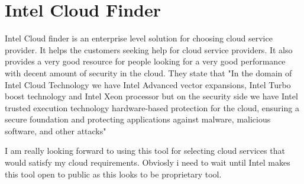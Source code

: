 \section{Intel Cloud Finder}

Intel Cloud finder is an enterprise level solution for choosing cloud service 
provider. It helps the customers seeking help for cloud service providers. It 
also provides a very good resource for people looking for a very good 
performance with decent amount of security in the cloud. They state that 
"In the domain of Intel Cloud Technology we have Intel Advanced vector expansions, 
Intel Turbo boost technology and Intel Xeon processor but on the 
security side we have Intel trusted execution technology hardware-based protection 
for the cloud, ensuring a secure foundation and protecting applications against 
malware, malicious software, and other attacks"~\cite{Intel}

I am really looking forward to using this tool for selecting cloud services that would satisfy 
my cloud requirements. Obviosly i need to wait until Intel makes this tool open to public as this
looks to be proprietary tool.
